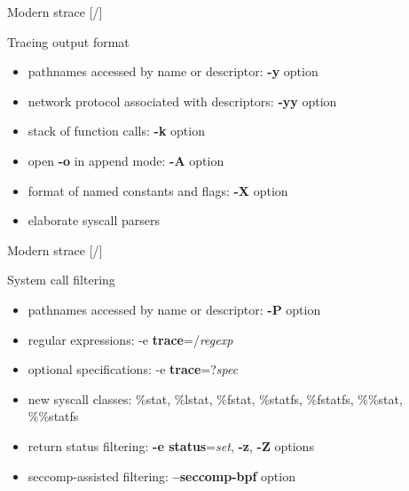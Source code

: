 \documentclass[unicode,aspectratio=169]{beamer}
\begin{document}
\begin{frame}{Modern strace \hfill [\insertframenumber/\inserttotalframenumber]}
\Large
\begin{block}{Tracing output format}
\begin{itemize}
\item pathnames accessed by name or descriptor: \textbf{-y} option
\item network protocol associated with descriptors: \textbf{-yy} option
\item stack of function calls: \textbf{-k} option
\item open \textbf{-o} in append mode: \textbf{-A} option
\item format of named constants and flags: \textbf{-X} option
\item elaborate syscall parsers
\end{itemize}
\end{block}
\end{frame}


\begin{frame}{Modern strace \hfill [\insertframenumber/\inserttotalframenumber]}
\Large
\begin{block}{System call filtering}
\begin{itemize}
\item pathnames accessed by name or descriptor: \textbf{-P} option
\item regular expressions: -e \textbf{trace}=/\textit{regexp}
\item optional specifications: -e \textbf{trace}=?\textit{spec}
\item new syscall classes: \%stat, \%lstat, \%fstat, \%statfs, \%fstatfs, \%\%stat, \%\%statfs
\item return status filtering: \textbf{-e status}=\textit{set}, \textbf{-z}, \textbf{-Z} options
\item seccomp-assisted filtering: \textbf{--seccomp-bpf} option
\end{itemize}
\end{block}
\end{frame}
\end{document}

